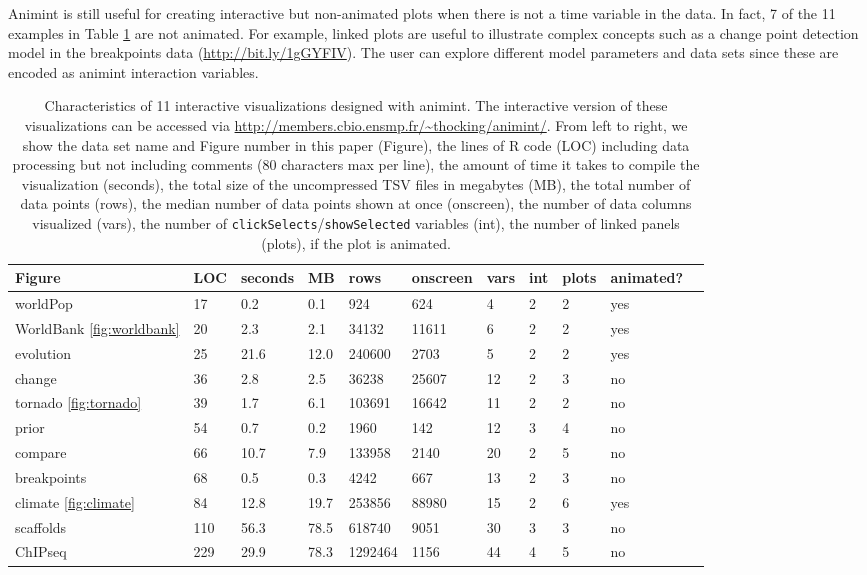 \documentclass[12pt,]{article}
\theoremstyle{definition}
\theoremstyle{definition}
\theoremstyle{remark}
\begin{document}
Animint is still useful for creating interactive but non-animated plots
when there is not a time variable in the data. In fact, 7 of the 11
examples in Table \ref{tab:examples} are not animated. For example,
linked plots are useful to illustrate complex concepts such as a change
point detection model in the breakpoints data
(\url{http://bit.ly/1gGYFIV}). The user can explore different model
parameters and data sets since these are encoded as animint interaction
variables.

\begin{table}

\caption{
Characteristics of 11 interactive visualizations designed with
    animint. The interactive version of these visualizations can be accessed 
    via \url{http://members.cbio.ensmp.fr/~thocking/animint/}.
    From left to right, we show the data set name and 
    Figure number in this paper (Figure), the
    lines of R code (LOC) including data processing but not including comments
    (80 characters max per line),
    the amount of time it takes to compile the visualization (seconds),
    the total size of the uncompressed TSV files in megabytes (MB),
    the total number of data points (rows),
    the median number of data points shown at once (onscreen),
    the number of data columns visualized (vars),
    the number of \texttt{clickSelects}/\texttt{showSelected} 
    variables (int),
    the number of linked panels (plots),
    if the plot is animated.
}\label{tab:examples}

\begin{tabularx}{\textwidth}{|l|l|l|l|l|l|l|l|l|l|l|}
    \hline
 Figure & LOC & seconds & MB & rows & onscreen & vars & int & plots & animated? \\ 
  \hline
  worldPop & 17 & 0.2 & 0.1 & 924 & 624 &  4 &  2 &  2 & yes  \\ 
  WorldBank \ref{fig:worldbank} & 20 & 2.3 & 2.1 & 34132 & 11611 &  6 &  2 &  2 & yes \\ 
  evolution & 25 & 21.6 & 12.0 & 240600 & 2703 &  5 &  2 &  2 & yes  \\ 
  change & 36 & 2.8 & 2.5 & 36238 & 25607 & 12 &  2 &  3 & no  \\ 
  tornado  \ref{fig:tornado} & 39 & 1.7 & 6.1 & 103691 & 16642 & 11 &  2 &  2 & no \\ 
  prior & 54 & 0.7 & 0.2 & 1960 & 142 & 12 &  3 &  4 & no  \\ 
  compare & 66 & 10.7 & 7.9 & 133958 & 2140 & 20 &  2 &  5 & no  \\ 
  breakpoints & 68 & 0.5 & 0.3 & 4242 & 667 & 13 &  2 &  3 & no  \\ 
  climate \ref{fig:climate} & 84 & 12.8 & 19.7 & 253856 & 88980 & 15 &  2 &  6 & yes \\ 
  scaffolds & 110 & 56.3 & 78.5 & 618740 & 9051 & 30 &  3 &  3 & no  \\ 
  ChIPseq & 229 & 29.9 & 78.3 & 1292464 & 1156 & 44 &  4 &  5 & no  \\
  \hline
\end{tabularx}

\end{table}
\end{document}
